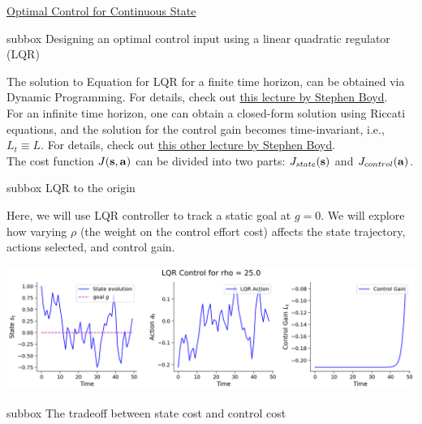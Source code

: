 \begin{textbox}{\href{https://compneuro.neuromatch.io/tutorials/W3D3_OptimalControl/student/W3D3_Tutorial2.html}{Optimal Control for Continuous State}}
\begin{subbox}{subbox}{ Designing an optimal control input using a linear quadratic regulator (LQR)}
\scriptsize

The solution to Equation for LQR for a finite time horizon, can be obtained via Dynamic Programming. For details, check out \href{https://stanford.edu/class/ee363/lectures/dlqr.pdf}{this lecture by Stephen Boyd}.\\
For an infinite time horizon, one can obtain a closed-form solution using Riccati equations, and the solution for the control gain becomes time-invariant, i.e., $L_t \equiv L$.  For  details, check out 
\href{https://stanford.edu/class/ee363/lectures/dlqr-ss.pdf}{this other lecture by Stephen Boyd}.\\
The cost function $J({\bf s}, {\bf a})$ can be divided into two parts: $J_{state}({\bf s})$ and $J_{control}({\bf a})$. 

\end{subbox}

\begin{subbox}{subbox}{ LQR to the origin }
\scriptsize

Here, we will use LQR controller to track a static goal at $g=0$. We will explore how varying $\rho$ (the weight on the control effort cost) affects the state trajectory, actions selected, and control gain.

\begin{center}
    
\includegraphics[scale=0.2]{Figures/OC/OC_Figure9.png}
\end{center}

\end{subbox}
\begin{subbox}{subbox}{ The tradeoff between state cost and control cost }
\scriptsize


\end{subbox}
\end{textbox}
